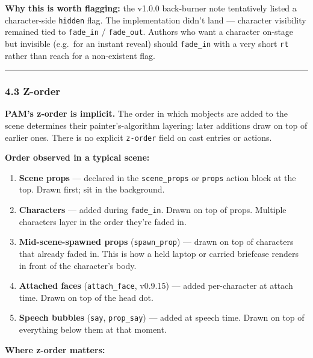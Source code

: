 \documentclass[
  12pt,
  letterpaper,
]{book}
\providecommand{\tightlist}{%
  \setlength{\itemsep}{0pt}\setlength{\parskip}{0pt}}
\begin{document}
\textbf{Why this is worth flagging:} the v1.0.0 back-burner note
tentatively listed a character-side \texttt{hidden} flag. The
implementation didn't land --- character visibility remained tied to
\texttt{fade\_in} / \texttt{fade\_out}. Authors who want a character
on-stage but invisible (e.g.~for an instant reveal) should
\texttt{fade\_in} with a very short \texttt{rt} rather than reach for a
non-existent flag.

\begin{center}\rule{0.5\linewidth}{0.5pt}\end{center}

\subsubsection{4.3 Z-order}\label{z-order}

\textbf{PAM's z-order is implicit.} The order in which mobjects are
added to the scene determines their painter's-algorithm layering: later
additions draw on top of earlier ones. There is no explicit
\texttt{z-order} field on cast entries or actions.

\textbf{Order observed in a typical scene:}

\begin{enumerate}
\def\labelenumi{\arabic{enumi}.}
\tightlist
\item
  \textbf{Scene props} --- declared in the \texttt{scene\_props} or
  \texttt{props} action block at the top. Drawn first; sit in the
  background.
\item
  \textbf{Characters} --- added during \texttt{fade\_in}. Drawn on top
  of props. Multiple characters layer in the order they're faded in.
\item
  \textbf{Mid-scene-spawned props} (\texttt{spawn\_prop}) --- drawn on
  top of characters that already faded in. This is how a held laptop or
  carried briefcase renders in front of the character's body.
\item
  \textbf{Attached faces} (\texttt{attach\_face}, v0.9.15) --- added
  per-character at attach time. Drawn on top of the head dot.
\item
  \textbf{Speech bubbles} (\texttt{say}, \texttt{prop\_say}) --- added
  at speech time. Drawn on top of everything below them at that moment.
\end{enumerate}

\textbf{Where z-order matters:}
\end{document}
